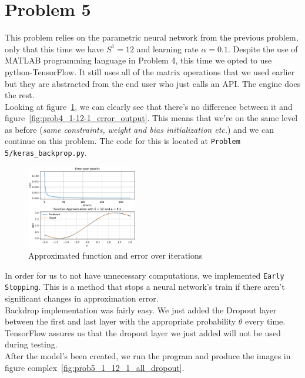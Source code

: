 \section{Problem 5}

This problem relies on the parametric neural network from the previous problem, only that this time we have $S^1=12$ and learning rate $\alpha=0.1$. Despite the use of MATLAB programming language in Problem 4, this time we opted to use python-TensorFlow. It still uses all of the matrix operations that we used earlier but they are abstracted from the end user who just calls an API. The engine does the rest.\\

Looking at figure~\ref{fig:prob5_1_12_1_nodp}, we can clearly see that there's no difference between it and figure~\ref{fig:prob4_1-12-1_error_output}. This means that we're on the same level as before (\textit{same constraints, weight and bias initialization etc.}) and we can continue on this problem.
The code for this is located at \verb|Problem 5/keras_backprop.py|.\\


\begin{figure}
	\centering
	\includegraphics[width=0.43\textwidth]{../Problem 5/nn_1_12_1_nodp.pdf}
	\caption{Approximated function and error over iterations}
	\label{fig:prob5_1_12_1_nodp}
\end{figure}


In order for us to not have unnecessary computations, we implemented \verb|Early Stopping|. This is a method that stops a neural network's train if there aren't significant changes in approximation error.\\

Backdrop implementation was fairly easy. We just added the Dropout layer between the first and last layer with the appropriate probability $\theta$ every time. TensorFlow assures us that the dropout layer we just added will not be used during testing.\\
After the model's been created, we run the program and produce the images in figure complex~\ref{fig:prob5_1_12_1_all_dropout}.

